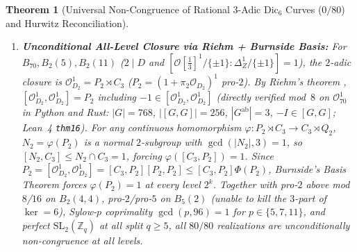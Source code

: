 \documentclass[11pt]{amsart}
\numberwithin{equation}{section}
\theoremstyle{plain}
\newtheorem{theorem}{Theorem}[section]
\theoremstyle{definition}\newtheorem{definition}[theorem]{Definition}
\theoremstyle{remark}\newtheorem{remark}[theorem]{Remark}
\newcommand{\Z}{\mathbb{Z}}
\newcommand{\calO}{\mathcal{O}}
\newcommand{\SL}{\mathrm{SL}}
\newcommand{\Dic}{\mathrm{Dic}}
\begin{document}
\begin{theorem}[Universal Non-Congruence of Rational $3$-Adic $\Dic_6$ Curves ($0/80$) and Hurwitz Reconciliation]
\begin{enumerate}[label=(\arabic*),nosep]
\item \textbf{Unconditional All-Level Closure via Riehm + Burnside Basis:} For $B_{70}, B_2(5), B_2(11)$ ($2\mid D$ and $[\calO[\frac{1}{3}]^1/\{\pm 1\}:\Delta_Z^1/\{\pm 1\}]=1$), the $2$-adic closure is $\calO_{D_2}^1 = P_2 \rtimes C_3$ ($P_2=(1+\pi_2\calO_{D_2})^1$ pro-$2$). By Riehm's theorem \cite{riehm1970}, $[\calO_{D_2}^1, \calO_{D_2}^1] = P_2$ including $-1\in[\calO_{D_2}^1,\calO_{D_2}^1]$ (directly verified mod~$8$ on $\calO_{70}^1$ in Python and Rust: $|G|=768$, $|[G,G]|=256$, $|G^{\mathrm{ab}}|=3$, $-I\in[G,G]$; Lean~4 \texttt{thm16}). For any continuous homomorphism $\varphi : P_2\rtimes C_3 \to C_3\rtimes Q_2$, $N_2=\varphi(P_2)$ is a normal $2$-subgroup with $\gcd(|N_2|,3)=1$, so $[N_2, C_3]\le N_2\cap C_3 = 1$, forcing $\varphi([C_3, P_2]) = 1$. Since $P_2 = [\calO_{D_2}^1, \calO_{D_2}^1] = [C_3,P_2][P_2,P_2] \le [C_3,P_2]\Phi(P_2)$, Burnside's Basis Theorem \cite{burnside1911} forces $\varphi(P_2) = 1$ at every level $2^k$. Together with pro-$2$ above mod~$8$/$16$ on $B_2(4,4)$, pro-$2$/pro-$5$ on $B_5(2)$ (unable to kill the $3$-part of $\ker=6$), Sylow-$p$ coprimality $\gcd(p,96)=1$ for $p\in\{5,7,11\}$, and perfect $\SL_2(\Z_q)$ at all split $q\ge 5$, all $80/80$ realizations are unconditionally non-congruence at all levels.
\end{enumerate}
\end{theorem}

\begin{table}[htbp]
\centering
\caption{Complete diagonal-$\pm 1$ CRT true left-multiplication $\Gamma(M)=\ker(\calO^1\to(\calO/M\calO)^1)/\{\pm 1\}$ congruence audit across all $5$ rational $3$-adic $\Dic_6$ curves and all $80$ realizations ($0/80$ congruence; $|\prod L|$ reports signed pre-$\pm 1$ orders, projective orders half as large; Hurwitz $B_2(4,4)$ already hits $\{3:16\}$ at $L_8/\{\pm 1\}$ of order $64$).}
\label{tab:crt_80}
\footnotesize
\setlength{\tabcolsep}{4pt}
\end{table}
\end{document}
